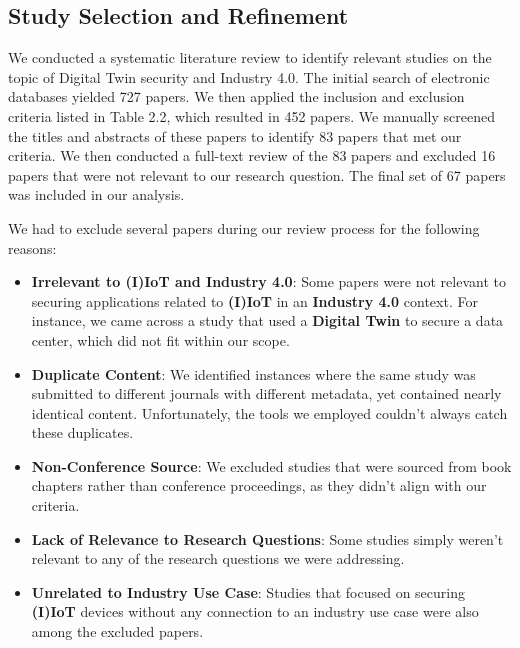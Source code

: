 \subsection{Study Selection and Refinement}


We conducted a systematic literature review to identify relevant studies on the topic of Digital Twin security and Industry 4.0. The initial search of electronic databases yielded 727 papers. We then applied the inclusion and exclusion criteria listed in Table 2.2, which resulted in 452 papers. We manually screened the titles and abstracts of these papers to identify 83 papers that met our criteria. We then conducted a full-text review of the 83 papers and excluded 16 papers that were not relevant to our research question. The final set of 67 papers was included in our analysis.



We had to exclude several papers during our review process for the following reasons:
\begin{itemize}
   \item \textbf{Irrelevant to (I)IoT and Industry 4.0}: Some papers were not relevant to securing applications related to \textbf{(I)IoT} in an \textbf{Industry 4.0} context. For instance, we came across a study that used a \textbf{Digital Twin} to secure a data center, which did not fit within our scope.

    \item \textbf{Duplicate Content}: We identified instances where the same study was submitted to different journals with different metadata, yet contained nearly identical content. Unfortunately, the tools we employed couldn't always catch these duplicates.
    
    \item \textbf{Non-Conference Source}: We excluded studies that were sourced from book chapters rather than conference proceedings, as they didn't align with our criteria.
    
    \item \textbf{Lack of Relevance to Research Questions}: Some studies simply weren't relevant to any of the research questions we were addressing.
    
    \item \textbf{Unrelated to Industry Use Case}: Studies that focused on securing \textbf{(I)IoT} devices without any connection to an industry use case were also among the excluded papers.
    
\end{itemize}

